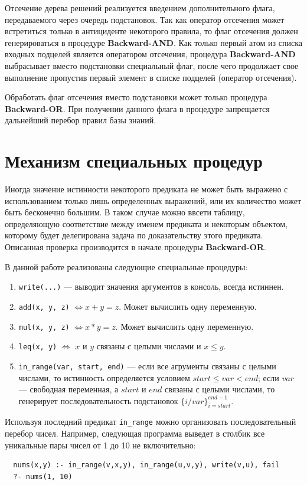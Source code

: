 Отсечение дерева решений реализуется введением дополнительного флага, передаваемого через очередь подстановок. Так как оператор отсечения может встретиться только в антициденте некоторого правила, то флаг отсечения должен генерироваться в процедуре \textbf{Backward-AND}. Как только первый атом из списка входных подцелей является оператором отсечения, процедура \textbf{Backward-AND} выбрасывает вместо подстановки специальный флаг, после чего продолжает свое выполнение пропустив первый элемент в списке подцелей (оператор отсечения).

Обработать флаг отсечения вместо подстановки может только процедура \textbf{Backward-OR}. При получении данного флага в процедуре запрещается дальнейший перебор правил базы знаний. 

\section{Механизм специальных процедур}

Иногда значение истинности некоторого предиката не может быть выражено с использованием только лишь определенных выражений, или их количество может быть бесконечно большим. В таком случае можно ввсети таблицу, определяющую соответствие между именем предиката и некоторым объектом, которому будет делегирована задача по доказательству этого предиката. Описанная проверка производится в начале процедуры \textbf{Backward-OR}.

В данной работе реализованы следующие специальные процедуры:
\begin{enumerate}
  \item \texttt{write(...)} --- выводит значения аргументов в консоль, всегда истиннен.
  \item \texttt{add(x, y, z)} $\Leftrightarrow x + y = z$. Может вычислить одну переменную.
  \item \texttt{mul(x, y, z)} $\Leftrightarrow x * y = z$. Может вычислить одну переменную.
  \item \texttt{leq(x, y)} $\Leftrightarrow$ $x$ и $y$ связаны с целыми числами и $x \le y$.
  \item \texttt{in\_range(var, start, end)} --- если все агрументы связаны с целыми числами, то истинность определяется условием $start \le var < end$; если $var$ --- свободная переменная, а $start$ и $end$ связаны с целыми числами, то генерирует последовательность подстановок $\{i/var\}_{i=start}^{end-1}$.
\end{enumerate}

Используя последний предикат \texttt{in\_range} можно организовать последовательный перебор чисел. Например, следующая программа выведет в столбик все уникальные пары чисел от 1 до 10 не включительно:
\begin{verbatim}
  nums(x,y) :- in_range(v,x,y), in_range(u,v,y), write(v,u), fail
  ?- nums(1, 10)
\end{verbatim}

